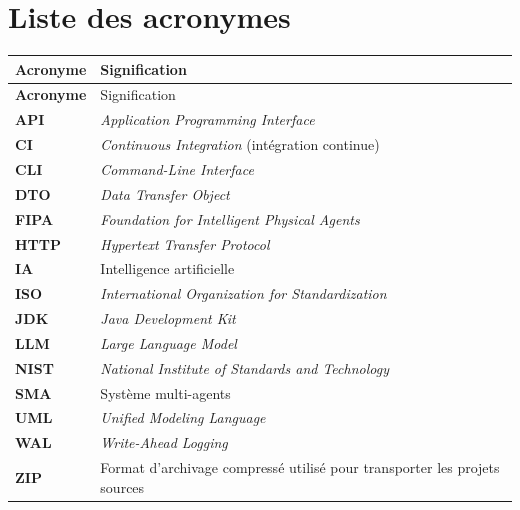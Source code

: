 \chapter*{Liste des acronymes}

\begin{longtable}{@{}>{\bfseries}p{2.7cm}p{10.8cm}@{}}
\toprule
Acronyme & Signification \\
\midrule
\endfirsthead
\toprule
Acronyme & Signification \\
\midrule
\endhead
API & \textit{Application Programming Interface} \\
CI & \textit{Continuous Integration} (intégration continue) \\
CLI & \textit{Command-Line Interface} \\
DTO & \textit{Data Transfer Object} \\
FIPA & \textit{Foundation for Intelligent Physical Agents} \\
HTTP & \textit{Hypertext Transfer Protocol} \\
IA & Intelligence artificielle \\
ISO & \textit{International Organization for Standardization} \\
JDK & \textit{Java Development Kit} \\
LLM & \textit{Large Language Model} \\
NIST & \textit{National Institute of Standards and Technology} \\
SMA & Système multi-agents \\
UML & \textit{Unified Modeling Language} \\
WAL & \textit{Write-Ahead Logging} \\
ZIP & Format d'archivage compressé utilisé pour transporter les projets sources \\
\bottomrule
\end{longtable}
